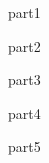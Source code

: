 \documentclass[german]{uebung}
\begin{document}
\begin{exercise}{1}
	part1
\end{exercise}

\begin{exercise}{2}
	part2
\end{exercise}

\begin{exercise}{3}
	part3
\end{exercise}


\begin{exercise}{4}
	part4
\end{exercise}


\begin{exercise}{5}
	part5
\end{exercise}
\end{document}
